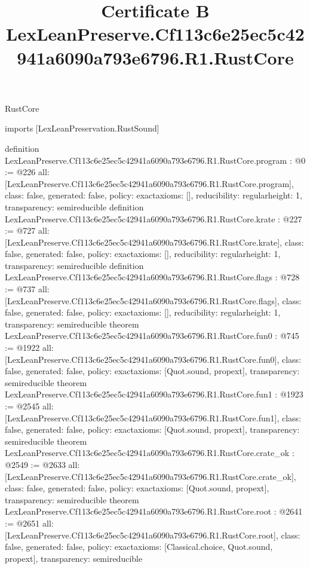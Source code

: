 \begin{lexlean}{RustCore}
\title{Certificate B LexLeanPreserve.Cf113c6e25ec5c42941a6090a793e6796.R1.RustCore}
\begin{coremodule}
imports [LexLeanPreservation.RustSound]

definition LexLeanPreserve.Cf113c6e25ec5c42941a6090a793e6796.R1.RustCore.program : @0 := @226 {
  all: [LexLeanPreserve.Cf113c6e25ec5c42941a6090a793e6796.R1.RustCore.program],
  class: false,
  generated: false,
  policy: exact{axioms: []},
  reducibility: regular{height: 1},
  transparency: semireducible
}
definition LexLeanPreserve.Cf113c6e25ec5c42941a6090a793e6796.R1.RustCore.krate : @227 := @727 {
  all: [LexLeanPreserve.Cf113c6e25ec5c42941a6090a793e6796.R1.RustCore.krate],
  class: false,
  generated: false,
  policy: exact{axioms: []},
  reducibility: regular{height: 1},
  transparency: semireducible
}
definition LexLeanPreserve.Cf113c6e25ec5c42941a6090a793e6796.R1.RustCore.flags : @728 := @737 {
  all: [LexLeanPreserve.Cf113c6e25ec5c42941a6090a793e6796.R1.RustCore.flags],
  class: false,
  generated: false,
  policy: exact{axioms: []},
  reducibility: regular{height: 1},
  transparency: semireducible
}
theorem LexLeanPreserve.Cf113c6e25ec5c42941a6090a793e6796.R1.RustCore.fun0 : @745 := @1922 {
  all: [LexLeanPreserve.Cf113c6e25ec5c42941a6090a793e6796.R1.RustCore.fun0],
  class: false,
  generated: false,
  policy: exact{axioms: [Quot.sound, propext]},
  transparency: semireducible
}
theorem LexLeanPreserve.Cf113c6e25ec5c42941a6090a793e6796.R1.RustCore.fun1 : @1923 := @2545 {
  all: [LexLeanPreserve.Cf113c6e25ec5c42941a6090a793e6796.R1.RustCore.fun1],
  class: false,
  generated: false,
  policy: exact{axioms: [Quot.sound, propext]},
  transparency: semireducible
}
theorem LexLeanPreserve.Cf113c6e25ec5c42941a6090a793e6796.R1.RustCore.crate_ok : @2549 := @2633 {
  all: [LexLeanPreserve.Cf113c6e25ec5c42941a6090a793e6796.R1.RustCore.crate_ok],
  class: false,
  generated: false,
  policy: exact{axioms: [Quot.sound, propext]},
  transparency: semireducible
}
theorem LexLeanPreserve.Cf113c6e25ec5c42941a6090a793e6796.R1.RustCore.root : @2641 := @2651 {
  all: [LexLeanPreserve.Cf113c6e25ec5c42941a6090a793e6796.R1.RustCore.root],
  class: false,
  generated: false,
  policy: exact{axioms: [Classical.choice, Quot.sound, propext]},
  transparency: semireducible
}


\end{coremodule}
\end{lexlean}
